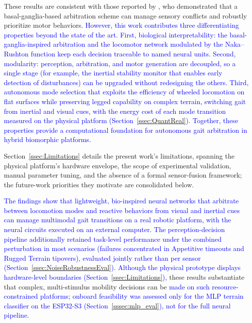\documentclass[preprint,12pt]{elsarticle}
\newcommand{\revblue}[1]{\textcolor{blue}{#1}}
\begin{document}
These results are consistent with those reported by \citet{sarvestani2013computational}, who demonstrated that a basal-ganglia-based arbitration scheme can manage sensory conflicts and robustly prioritize motor behaviors. \revblue{However, this work contributes three differentiating properties beyond the state of the art. First, biological interpretability: the basal-ganglia-inspired arbitration and the locomotor network modulated by the Naka--Rushton function keep each decision traceable to named neural units. Second, modularity: perception, arbitration, and motor generation are decoupled, so a single stage (for example, the inertial stability monitor that enables early detection of disturbances) can be upgraded without redesigning the others. Third, autonomous mode selection that exploits the efficiency of wheeled locomotion on flat surfaces while preserving legged capability on complex terrain, switching gait from inertial and visual cues, with the energy cost of each mode transition measured on the physical platform (Section~\ref{ssec:QuantReal}). Together, these properties provide a computational foundation for autonomous gait arbitration in hybrid biomorphic platforms.} 

Section~\ref{ssec:Limitations} details the present work's limitations, spanning the physical platform's hardware envelope, the scope of experimental validation, manual parameter tuning, and the absence of a formal sensor-fusion framework; the future-work priorities they motivate are consolidated below.

\revblue{The findings show that lightweight, bio-inspired neural networks that arbitrate between locomotion modes and reactive behaviors from visual and inertial cues can manage multimodal gait transitions on a real robotic platform, with the neural circuits executed on an external computer.} \revblue{The perception-decision pipeline additionally retained task-level performance under the combined perturbation in most scenarios (failures concentrated in Appetitive timeouts and Rugged Terrain tipovers), evaluated jointly rather than per sensor (Section~\ref{ssec:NoiseRobustnessEval}).} \revblue{Although the physical prototype displays hardware-level boundaries (Section~\ref{ssec:Limitations}),} these results substantiate that complex, multi-stimulus mobility decisions can be \revblue{made on such resource-constrained platforms; onboard feasibility was assessed only for the MLP terrain classifier on the ESP32-S3 (Section~\ref{sssec:mlp_eval}), not for the full neural pipeline}.
\end{document}
